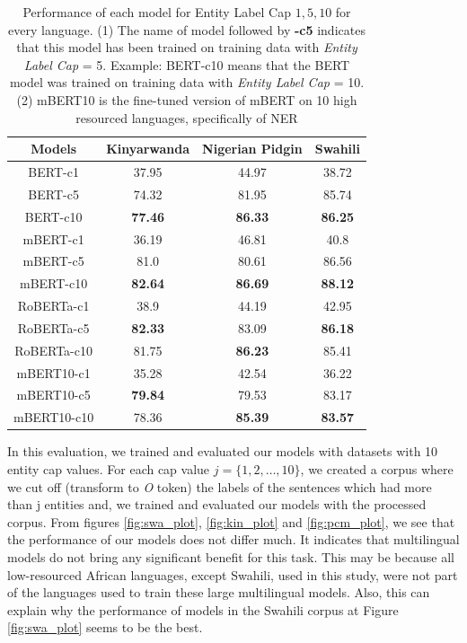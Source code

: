 \documentclass{article}
\begin{document}
\begin{table}
    \small
    \centering
    \label{UNET_and_GMM}
    \begin{tabular}{cccc}
        \toprule
        Models      & Kinyarwanda    & Nigerian Pidgin & Swahili        \\  \midrule
        BERT-c1     & 37.95          & 44.97           & 38.72          \\
        BERT-c5     & 74.32          & 81.95           & 85.74          \\
        BERT-c10    & \textbf{77.46} & \textbf{86.33}  & \textbf{86.25} \\ \midrule
        mBERT-c1    & 36.19          & 46.81           & 40.8           \\
        mBERT-c5    & 81.0           & 80.61           & 86.56          \\
        mBERT-c10   & \textbf{82.64} & \textbf{86.69}  & \textbf{88.12} \\ \midrule
        RoBERTa-c1  & 38.9           & 44.19           & 42.95          \\
        RoBERTa-c5  & \textbf{82.33} & 83.09           & \textbf{86.18} \\
        RoBERTa-c10 & 81.75          & \textbf{86.23}  & 85.41          \\ \midrule
        mBERT10-c1  & 35.28          & 42.54           & 36.22          \\
        mBERT10-c5  & \textbf{79.84} & 79.53           & 83.17          \\
        mBERT10-c10 & 78.36          & \textbf{85.39}  & \textbf{83.57} \\
        \bottomrule
    \end{tabular}
    \caption{Performance of each model for Entity Label Cap ${1, 5, 10}$ for every language. (1) The name of model followed by \textbf{-c5} indicates that this model has been trained on training data with \textit{Entity Label Cap} = 5. Example: BERT-c10 means that the BERT model was trained on training data with \textit{Entity Label Cap} = 10. (2) mBERT10 is the fine-tuned version of mBERT on 10 high resourced languages, specifically of NER}
\end{table}

In this evaluation, we trained and evaluated our models with datasets with 10 entity cap values. For each cap value $j = \{1,2, \dots, 10\}$, we created a corpus where we cut off (transform to \textit{O} token) the labels of the sentences which had more than j entities and, we trained and evaluated our models with the processed corpus. From figures \ref{fig:swa_plot}, \ref{fig:kin_plot} and \ref{fig:pcm_plot}, we see that the performance of our models does not differ much. It indicates that multilingual models do not bring any significant benefit for this task. This may be because all low-resourced African languages, except Swahili, used in this study, were not part of the languages used to train these large multilingual models. Also, this can explain why the performance of models in the Swahili corpus at Figure \ref{fig:swa_plot} seems to be the best.
\end{document}
